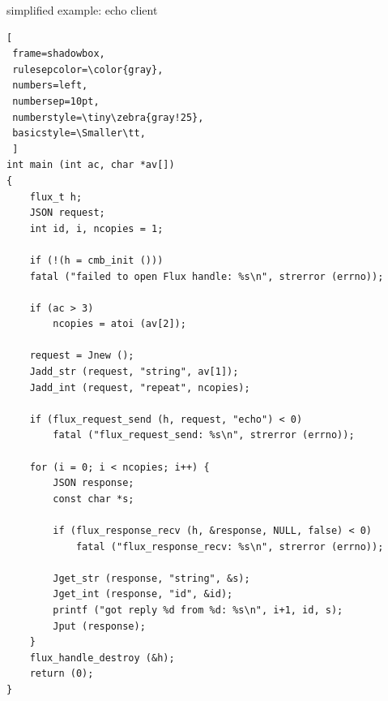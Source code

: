 \documentclass[default,pdf,colorBG,slideColor]{prosper}
\makeatletter
\newcommand\Smaller{\fontsize{5.5}{5.5}\selectfont}
\newcommand\realnumberstyle[1]{}
\newcommand{\zebra}[2]{%
    {\realnumberstyle{#2}}%
    \begingroup
    \lst@basicstyle
    \ifodd\value{lstnumber}%
        \color{#1}%
        \rlap{\hspace*{\lst@numbersep}%
        \color@block{\linewidth}{\ht\strutbox}{\dp\strutbox}%
        }%
    \fi
    \endgroup
}
\makeatother
\begin{document}
\begin{slide}{simplified example: echo client}
\vspace{-0.3in}
{\tiny\bf
\begin{lstlisting}[
 frame=shadowbox,
 rulesepcolor=\color{gray},
 numbers=left,
 numbersep=10pt,
 numberstyle=\tiny\zebra{gray!25},
 basicstyle=\Smaller\tt,
 ]
int main (int ac, char *av[])
{
    flux_t h;
    JSON request;
    int id, i, ncopies = 1;

    if (!(h = cmb_init ()))
	fatal ("failed to open Flux handle: %s\n", strerror (errno));

    if (ac > 3)
        ncopies = atoi (av[2]);

    request = Jnew ();
    Jadd_str (request, "string", av[1]);
    Jadd_int (request, "repeat", ncopies);
    
    if (flux_request_send (h, request, "echo") < 0)
        fatal ("flux_request_send: %s\n", strerror (errno));

    for (i = 0; i < ncopies; i++) {
        JSON response;
        const char *s;

        if (flux_response_recv (h, &response, NULL, false) < 0)
            fatal ("flux_response_recv: %s\n", strerror (errno));

        Jget_str (response, "string", &s);
        Jget_int (response, "id", &id);
        printf ("got reply %d from %d: %s\n", i+1, id, s);
        Jput (response);
    }
    flux_handle_destroy (&h);
    return (0);
}
\end{lstlisting}
} \end{slide}


\end{document}
